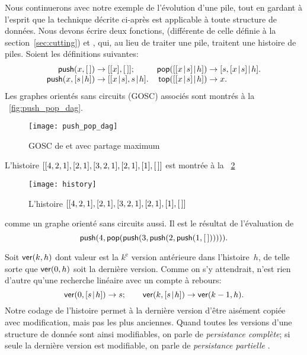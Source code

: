 Nous continuerons avec notre exemple de l'évolution d'une pile, tout
en gardant à l'esprit que la technique décrite ci-après est applicable
à toute structure de données. Nous devons écrire deux fonctions,
 (différente de celle définie à
la section~\ref{sec:cutting}) et ,
qui, au lieu de traiter une pile, traitent une histoire de
piles. Soient les définitions suivantes:
\begin{equation}
\begin{array}{@{}r@{\;}c@{\;}l@{\quad}r@{\;}c@{\;}l@{}}
\fun{push}(x,\el) & \rightarrow & [[x],\el];
& \fun{pop}(\cons{\cons{x}{s}}{h}) & \rightarrow &
                                     \cons{s,\cons{x}{s}}{h}.\\
\fun{push}(x,\cons{s}{h}) & \rightarrow &
\cons{\cons{x}{s},s}{h}. &
\fun{top}(\cons{\cons{x}{s}}{h}) & \rightarrow & x.
\end{array}
\label{eq:push_pop_persistence}
\end{equation}
Les graphes orientés sans circuits (GOSC) associés sont montrés à la
\fig~\vref{fig:push_pop_dag}.
\begin{figure}[b]
\centering
\texttt{[image: push\_pop\_dag]}
\caption{GOSC de  et  avec partage maximum}
\label{fig:push_pop_dag}
\end{figure}
L'histoire \([[4,2,1],[2,1],[3,2,1],[2,1],[1],[\,]]\) est montrée
à la \fig~\ref{fig:history}
\begin{figure}
\centering
\texttt{[image: history]}
\caption{L'histoire \([[4,2,1],[2,1],[3,2,1],[2,1],[1],[\,]]\)}
\label{fig:history}
\end{figure}
comme un graphe orienté sans circuits aussi. Il est le résultat de
l'évaluation de
\begin{equation}
\textsf{push}(4, \textsf{pop}(\textsf{push}(3, \textsf{push}(2,
\textsf{push}(1, [\,]))))).
\label{ex_history}
\end{equation}

Soit \(\textsf{ver}(k,h)\)  dont valeur est la
\(k^\text{e}\) version antérieure dans l'histoire~\(h\), de telle
sorte que \(\textsf{ver}(0,h)\) soit la dernière version. Comme on s'y
attendrait,  n'est rien d'autre qu'une recherche linéaire
avec un compte à rebours:
\begin{equation*}
\abovedisplayskip=3pt
\belowdisplayskip=3pt
\fun{ver}(0,\cons{s}{h}) \rightarrow s;\qquad
\fun{ver}(k,\cons{s}{h}) \rightarrow \fun{ver}(k-1,h).
\end{equation*}
Notre codage de l'histoire permet à la dernière version d'être
aisément copiée avec modification, mais pas les plus anciennes. Quand
toutes les versions d'une structure de donnée sont ainsi modifiables,
on parle de \emph{persistance complète}; si seule la dernière version est modifiable, on parle de
\emph{persistance partielle}
\citep{MehlhornTsakalidis_1990}.

